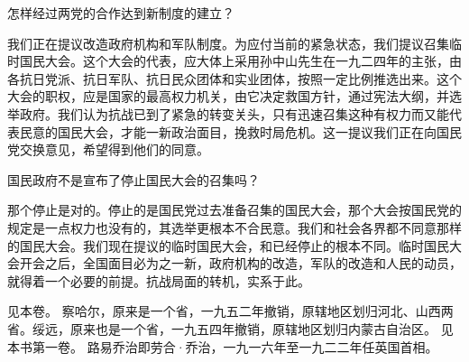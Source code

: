 怎样经过两党的合作达到新制度的建立？

我们正在提议改造政府机构和军队制度。为应付当前的紧急状态，我们提议召集临时国民大会。这个大会的代表，应大体上采用孙中山先生在一九二四年的主张，由各抗日党派、抗日军队、抗日民众团体和实业团体，按照一定比例推选出来。这个大会的职权，应是国家的最高权力机关，由它决定救国方针，通过宪法大纲，并选举政府。我们认为抗战已到了紧急的转变关头，只有迅速召集这种有权力而又能代表民意的国民大会，才能一新政治面目，挽救时局危机。这一提议我们正在向国民党交换意见，希望得到他们的同意。

国民政府不是宣布了停止国民大会的召集吗？

那个停止是对的。停止的是国民党过去准备召集的国民大会，那个大会按国民党的规定是一点权力也没有的，其选举更根本不合民意。我们和社会各界都不同意那样的国民大会。我们现在提议的临时国民大会，和已经停止的根本不同。临时国民大会开会之后，全国面目必为之一新，政府机构的改造，军队的改造和人民的动员，就得着一个必要的前提。抗战局面的转机，实系于此。


\begin{maonote}
见本卷。
察哈尔，原来是一个省，一九五二年撤销，原辖地区划归河北、山西两省。绥远，原来也是一个省，一九五四年撤销，原辖地区划归内蒙古自治区。
见本书第一卷。
路易乔治即劳合·乔治，一九一六年至一九二二年任英国首相。
\end{maonote}
